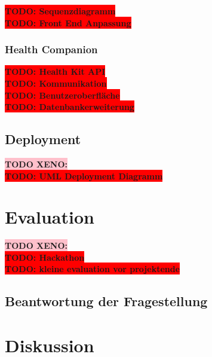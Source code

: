 \documentclass[12pt,a4paper]{report}
\newcommand{\todo}[1]{\colorbox{red}{\textbf{TODO: #1}}\\}
\newcommand{\xeno}[1]{\colorbox{pink}{\textbf{TODO XENO: #1}}\\}
\begin{document}
\todo{Sequenzdiagramm}
\todo{Front End Anpassung}

\subsection{Health Companion}

\todo{Health Kit API}
\todo{Kommunikation}
\todo{Benutzeroberfläche}
\todo{Datenbankerweiterung}

\section{Deployment}
\xeno{}
\todo{UML Deployment Diagramm}

\chapter{Evaluation}
\xeno{}
\todo{Hackathon}
\todo{kleine evaluation vor projektende}
\section{Beantwortung der Fragestellung}

\chapter{Diskussion}

\printbibliography
\end{document}
